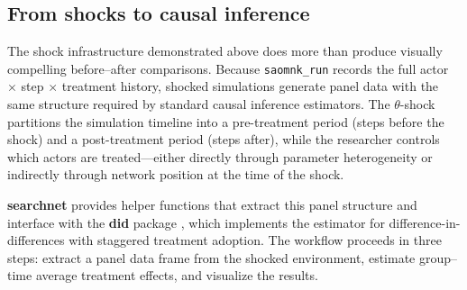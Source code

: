 \documentclass[
]{article}
\newenvironment{Shaded}{\begin{snugshade}}{\end{snugshade}}
\newcommand{\AttributeTok}[1]{\textcolor[rgb]{0.13,0.29,0.53}{#1}}
\newcommand{\CommentTok}[1]{\textcolor[rgb]{0.56,0.35,0.01}{\textit{#1}}}
\newcommand{\ConstantTok}[1]{\textcolor[rgb]{0.56,0.35,0.01}{#1}}
\newcommand{\ControlFlowTok}[1]{\textcolor[rgb]{0.13,0.29,0.53}{\textbf{#1}}}
\newcommand{\DecValTok}[1]{\textcolor[rgb]{0.00,0.00,0.81}{#1}}
\newcommand{\DocumentationTok}[1]{\textcolor[rgb]{0.56,0.35,0.01}{\textbf{\textit{#1}}}}
\newcommand{\FunctionTok}[1]{\textcolor[rgb]{0.13,0.29,0.53}{\textbf{#1}}}
\newcommand{\NormalTok}[1]{#1}
\newcommand{\OtherTok}[1]{\textcolor[rgb]{0.56,0.35,0.01}{#1}}
\newcommand{\SpecialCharTok}[1]{\textcolor[rgb]{0.81,0.36,0.00}{\textbf{#1}}}
\newcommand{\StringTok}[1]{\textcolor[rgb]{0.31,0.60,0.02}{#1}}
\begin{document}
\subsection{From shocks to causal inference}\label{sec:causal}

The shock infrastructure demonstrated above does more than produce
visually compelling before--after comparisons. Because
\texttt{saomnk\_run} records the full actor \(\times\) step \(\times\)
treatment history, shocked simulations generate panel data with the same
structure required by standard causal inference estimators. The
\(\theta\)-shock partitions the simulation timeline into a pre-treatment
period (steps before the shock) and a post-treatment period (steps
after), while the researcher controls which actors are treated---either
directly through parameter heterogeneity or indirectly through network
position at the time of the shock.

\textbf{searchnet} provides helper functions that extract this panel
structure and interface with the \textbf{did} package
\citep{CallawayS2021}, which implements the \citet{CallawayS2021}
estimator for difference-in-differences with staggered treatment
adoption. The workflow proceeds in three steps: extract a panel data
frame from the shocked environment, estimate group--time average
treatment effects, and visualize the results.

\begin{Shaded}
\end{Shaded}
\end{document}
